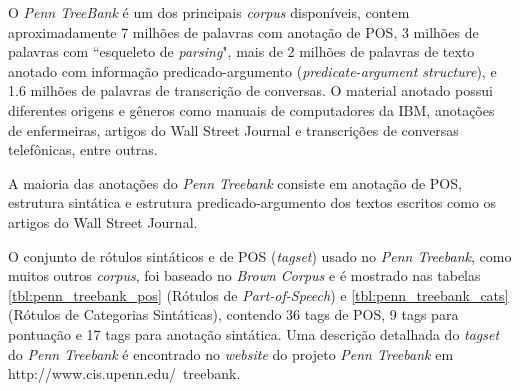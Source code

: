 O \emph{Penn TreeBank} é um dos principais \emph{corpus} disponíveis, contem aproximadamente 7 milhões de palavras com anotação de POS, 3 milhões de palavras com ``esqueleto de \emph{parsing}", mais de 2 milhões de palavras de texto anotado com informação predicado-argumento (\emph{predicate-argument structure}), e 1.6 milhões de palavras de transcrição de conversas. O material anotado possui diferentes origens e gêneros como manuais de computadores da IBM, anotações de enfermeiras, artigos do Wall Street Journal e transcrições de conversas telefônicas, entre outras.

A maioria das anotações do \emph{Penn Treebank} consiste em anotação de POS, estrutura sintática e estrutura predicado-argumento dos textos escritos como os artigos do Wall Street Journal.

O conjunto de rótulos sintáticos e de POS (\emph{tagset}) usado no \emph{Penn Treebank}, como muitos outros \emph{corpus}, foi baseado no \emph{Brown Corpus} e é mostrado nas tabelas \ref{tbl:penn_treebank_pos} (Rótulos de \emph{Part-of-Speech}) e \ref{tbl:penn_treebank_cats} (Rótulos de Categorias Sintáticas), contendo 36 tags de POS, 9 tags para pontuação e 17 tags para anotação sintática. Uma descrição detalhada do \emph{tagset} do \emph{Penn Treebank} é encontrado no \emph{website} do projeto \emph{Penn Treebank} em http://www.cis.upenn.edu/~treebank.

